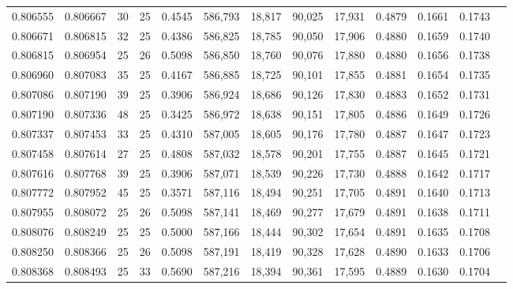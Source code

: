 \begin{tabular}{rrrrrrrrrrrrr}
0.806555 & 0.806667 &    30 &  25 &                                     0.4545 & 586,793 &  18,817 &  90,025 &  17,931 & 0.4879 & 0.1661 & 0.1743 \\
0.806671 & 0.806815 &    32 &  25 &                                     0.4386 & 586,825 &  18,785 &  90,050 &  17,906 & 0.4880 & 0.1659 & 0.1740 \\
0.806815 & 0.806954 &    25 &  26 &                                     0.5098 & 586,850 &  18,760 &  90,076 &  17,880 & 0.4880 & 0.1656 & 0.1738 \\
0.806960 & 0.807083 &    35 &  25 &                                     0.4167 & 586,885 &  18,725 &  90,101 &  17,855 & 0.4881 & 0.1654 & 0.1735 \\
0.807086 & 0.807190 &    39 &  25 &                                     0.3906 & 586,924 &  18,686 &  90,126 &  17,830 & 0.4883 & 0.1652 & 0.1731 \\
0.807190 & 0.807336 &    48 &  25 &                                     0.3425 & 586,972 &  18,638 &  90,151 &  17,805 & 0.4886 & 0.1649 & 0.1726 \\
0.807337 & 0.807453 &    33 &  25 &                                     0.4310 & 587,005 &  18,605 &  90,176 &  17,780 & 0.4887 & 0.1647 & 0.1723 \\
0.807458 & 0.807614 &    27 &  25 &                                     0.4808 & 587,032 &  18,578 &  90,201 &  17,755 & 0.4887 & 0.1645 & 0.1721 \\
0.807616 & 0.807768 &    39 &  25 &                                     0.3906 & 587,071 &  18,539 &  90,226 &  17,730 & 0.4888 & 0.1642 & 0.1717 \\
0.807772 & 0.807952 &    45 &  25 &                                     0.3571 & 587,116 &  18,494 &  90,251 &  17,705 & 0.4891 & 0.1640 & 0.1713 \\
0.807955 & 0.808072 &    25 &  26 &                                     0.5098 & 587,141 &  18,469 &  90,277 &  17,679 & 0.4891 & 0.1638 & 0.1711 \\
0.808076 & 0.808249 &    25 &  25 &                                     0.5000 & 587,166 &  18,444 &  90,302 &  17,654 & 0.4891 & 0.1635 & 0.1708 \\
0.808250 & 0.808366 &    25 &  26 &                                     0.5098 & 587,191 &  18,419 &  90,328 &  17,628 & 0.4890 & 0.1633 & 0.1706 \\
0.808368 & 0.808493 &    25 &  33 &                                     0.5690 & 587,216 &  18,394 &  90,361 &  17,595 & 0.4889 & 0.1630 & 0.1704 \\

\end{tabular}
